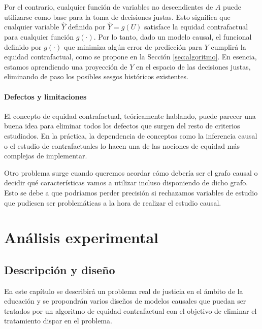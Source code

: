 \documentclass[oneside,openright,titlepage,numbers=noenddot,openany,headinclude,footinclude=true,
cleardoublepage=empty,abstractoff,BCOR=5mm,paper=a4,fontsize=12pt,main=spanish]{scrreprt}
\begin{document}
Por el contrario, cualquier función de variables no descendientes de $A$ puede utilizarse como base para la toma de decisiones justas. Esto significa que cualquier variable $\hat{Y}$ definida por $\hat{Y} = g(U)$ satisface la equidad contrafactual para cualquier función $g(\cdot)$. Por lo tanto, dado un modelo causal, el funcional definido por $g(\cdot)$ que minimiza algún error de predicción para $Y$ cumplirá la equidad contrafactual, como se propone en la Sección \ref{sec:algoritmo}. En esencia, estamos aprendiendo una proyección de $Y$ en el espacio de las decisiones justas, eliminando de paso los posibles sesgos históricos existentes.

\subsection*{Defectos y limitaciones}

El concepto de equidad contrafactual, teóricamente hablando, puede parecer una buena idea para eliminar todos los defectos que surgen del resto de criterios estudiados. En la práctica, la dependencia de conceptos como la inferencia causal o el estudio de contrafactuales lo hacen una de las nociones de equidad más complejas de implementar. 

Otro problema surge cuando queremos acordar cómo debería ser el grafo causal o decidir qué características vamos a utilizar incluso disponiendo de dicho grafo. Esto se debe a que podríamos perder precisión si rechazamos variables de estudio que pudiesen ser problemáticas a la hora de realizar el estudio causal.

\part{Análisis experimental}  \label{part:analisis_exp}


\chapter{Descripción y diseño} \label{ch:descdise}

En este capítulo se describirá un problema real de justicia en el ámbito de la educación y se propondrán varios diseños de modelos causales que puedan ser tratados por un algoritmo de equidad contrafactual con el objetivo de eliminar el tratamiento dispar en el problema.
\end{document}
